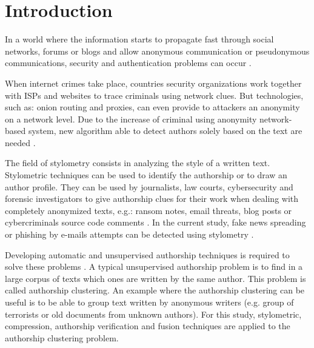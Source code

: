
\chapter{Introduction \label{sec:introduction}}

In a world where the information starts to propagate fast through social networks, forums or blogs and allow anonymous communication or pseudonymous communications, security and authentication problems can occur \cite{automated_unsupervised} \cite{kocher_pan16}.

When internet crimes take place, countries security organizations work together with ISPs and websites to trace criminals using network clues.
But technologies, such as: onion routing and proxies, can even provide to attackers an anonymity on a network level.
Due to the increase of criminal using anonymity network-based system, new algorithm able to detect authors solely based on the text are needed \cite{automated_unsupervised} \cite{attribution_in_cyberspace}.

The field of stylometry consists in analyzing the style of a written text.
Stylometric techniques can be used to identify the authorship or to draw an author profile.
They can be used by journalists, law courts, cybersecurity and forensic investigators to give authorship clues for their work when dealing with completely anonymized texts, e.g.: ransom notes, email threats, blog posts or cybercriminals source code comments \cite{pan16_clustering_site}.
In the current study, fake news spreading or phishing by e-mails attempts can be detected using stylometry \cite{unine_pan20_fake_news}.

Developing automatic and unsupervised authorship techniques is required to solve these problems \cite{automated_unsupervised}.
A typical unsupervised authorship problem is to find in a large corpus of texts which ones are written by the same author.
This problem is called authorship clustering.
An example where the authorship clustering can be useful is to be able to group text written by anonymous writers (e.g. group of terrorists or old documents from unknown authors).
For this study, stylometric, compression, authorship verification and fusion techniques are applied to the authorship clustering problem.





